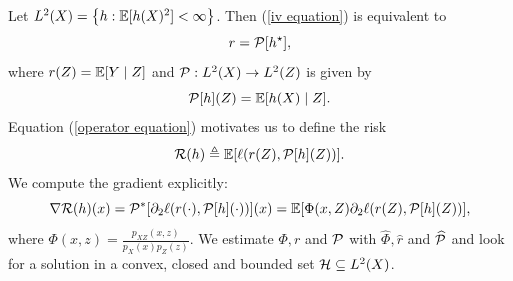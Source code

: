 \documentclass[
    a0paper,
    portrait,
    margin=3cm,
]{baposter}
\theoremstyle{fancy} %
\theoremstyle{regular}
\begin{document}
\begin{poster}
{    Let $ L^2 ( X ) = \left\{ h : \mathbb{E} [ h ( X )^2 ] < \infty \right\} $.
    Then (\ref{iv equation}) is equivalent to
    \begin{equation}
        \label{operator equation}
        r = \mathcal{P} [ h^{ \star } ]
    ,\end{equation}
    where $ r ( Z ) = \mathbb{E} [ Y \mid Z ] $ and $ \mathcal{P} : L^2 ( X ) \to L^2 ( Z ) $ is given by
    \begin{equation*}
        \mathcal{P} [ h ] ( Z ) = \mathbb{E} [ h ( X ) \mid Z ]
    .\end{equation*}
    Equation (\ref{operator equation}) motivates us to define the risk
    \begin{equation*}
        \mathcal{R} ( h ) \triangleq \mathbb{E} [ \ell ( r ( Z ), \mathcal{P} [ h ] ( Z ) ) ]
    .\end{equation*}
    We compute the gradient explicitly:
    \begin{equation*}
       \nabla \mathcal{R} ( h ) ( x )
       = \mathcal{P}^{ * } [ \partial_{ 2 } \ell ( r ( \cdot ), \mathcal{P} [ h ] ( \cdot ) ) ] ( x )
       = \mathbb{E} [ \Phi ( x, Z ) \partial_{ 2 } \ell ( r ( Z ), \mathcal{P} [ h ] ( Z ) ) ]
    ,\end{equation*}
    where $ \Phi ( x, z ) = \frac{ p_{ XZ } ( x, z ) }{ p_{ X } ( x ) p_{ Z } ( z ) } $.
    We estimate $ \Phi, r $ and $ \mathcal{P} $ with $ \hat{ \Phi }, \hat{ r } $ and $ \widehat{ \mathcal{P} } $ and look for a solution in a convex, closed and bounded set $ \mathcal{H} \subseteq L^2 ( X ) $.
}



\end{poster}
\end{document}
